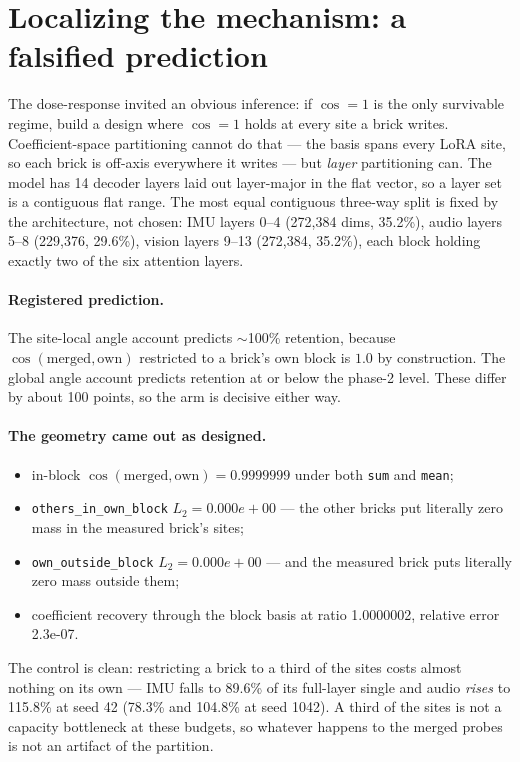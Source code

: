 \documentclass[11pt]{article}
\begin{document}
\section{Localizing the mechanism: a falsified prediction}
\label{sec:mechanism}
The dose-response invited an obvious inference: if $\cos = 1$ is the only survivable regime, build a design where $\cos = 1$ holds at every site a brick writes. Coefficient-space partitioning cannot do that --- the basis spans every LoRA site, so each brick is off-axis everywhere it writes --- but \emph{layer} partitioning can. The model has 14 decoder layers laid out layer-major in the flat vector, so a layer set is a contiguous flat range. The most equal contiguous three-way split is fixed by the architecture, not chosen: IMU layers 0--4 (272,384 dims, 35.2\%), audio layers 5--8 (229,376, 29.6\%), vision layers 9--13 (272,384, 35.2\%), each block holding exactly two of the six attention layers.

\paragraph{Registered prediction.}
The site-local angle account predicts $\sim$100\% retention, because $\cos(\mathrm{merged}, \mathrm{own})$ restricted to a brick's own block is $1.0$ by construction. The global angle account predicts retention at or below the phase-2 level. These differ by about 100 points, so the arm is decisive either way.

\paragraph{The geometry came out as designed.}
\begin{itemize}
  \item in-block $\cos(\mathrm{merged}, \mathrm{own}) = 0.9999999$ under both \texttt{sum} and \texttt{mean};
  \item \texttt{others\_in\_own\_block} $L_2 = 0.000e+00$ --- the other bricks put literally zero mass in the measured brick's sites;
  \item \texttt{own\_outside\_block} $L_2 = 0.000e+00$ --- and the measured brick puts literally zero mass outside them;
  \item coefficient recovery through the block basis at ratio 1.0000002, relative error 2.3e-07.
\end{itemize}
The control is clean: restricting a brick to a third of the sites costs almost nothing on its own --- IMU falls to 89.6\% of its full-layer single and audio \emph{rises} to 115.8\% at seed 42 (78.3\% and 104.8\% at seed 1042). A third of the sites is not a capacity bottleneck at these budgets, so whatever happens to the merged probes is not an artifact of the partition.
\end{document}
